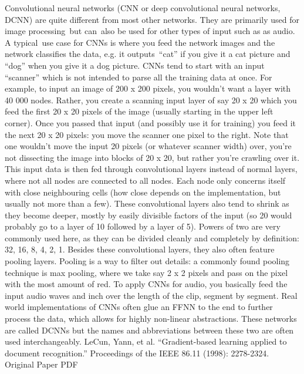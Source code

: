 \documentclass[11pt,a4paper,oneside]{ctexbook}
\begin{document}
Convolutional neural networks (CNN or deep convolutional neural networks, DCNN) are quite different from most other networks. They are primarily used for image processing but can also be used for other types of input such as as audio. A typical use case for CNNs is where you feed the network images and the network classifies the data, e.g. it outputs “cat” if you give it a cat picture and “dog” when you give it a dog picture. CNNs tend to start with an input “scanner” which is not intended to parse all the training data at once. For example, to input an image of 200 x 200 pixels, you wouldn’t want a layer with 40 000 nodes. Rather, you create a scanning input layer of say 20 x 20 which you feed the first 20 x 20 pixels of the image (usually starting in the upper left corner). Once you passed that input (and possibly use it for training) you feed it the next 20 x 20 pixels: you move the scanner one pixel to the right. Note that one wouldn’t move the input 20 pixels (or whatever scanner width) over, you’re not dissecting the image into blocks of 20 x 20, but rather you’re crawling over it. This input data is then fed through convolutional layers instead of normal layers, where not all nodes are connected to all nodes. Each node only concerns itself with close neighbouring cells (how close depends on the implementation, but usually not more than a few). These convolutional layers also tend to shrink as they become deeper, mostly by easily divisible factors of the input (so 20 would probably go to a layer of 10 followed by a layer of 5). Powers of two are very commonly used here, as they can be divided cleanly and completely by definition: 32, 16, 8, 4, 2, 1. Besides these convolutional layers, they also often feature pooling layers. Pooling is a way to filter out details: a commonly found pooling technique is max pooling, where we take say 2 x 2 pixels and pass on the pixel with the most amount of red. To apply CNNs for audio, you basically feed the input audio waves and inch over the length of the clip, segment by segment. Real world implementations of CNNs often glue an FFNN to the end to further process the data, which allows for highly non-linear abstractions. These networks are called DCNNs but the names and abbreviations between these two are often used interchangeably.
LeCun, Yann, et al. “Gradient-based learning applied to document recognition.” Proceedings of the IEEE 86.11 (1998): 2278-2324.
Original Paper PDF
\end{document}
